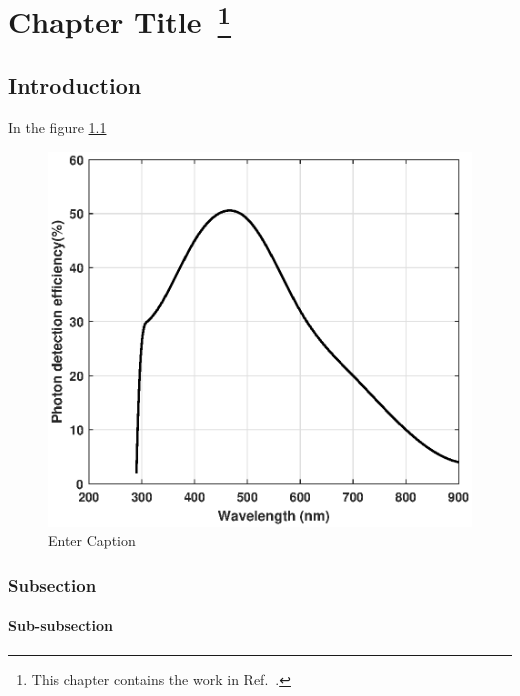 \chapter[Chapter Title]
{Chapter Title~\footnote{This chapter contains the work in Ref.~\cite{abc1}.}}
\label{chap:3}

\section{Introduction}
 In the figure \ref{fig:enter-label}  ~\cite{abc1} \lipsum[2-4]
\begin{figure}
    \centering
    \includegraphics[width=0.5\linewidth]{figures/pdeS13360.eps}
    \caption{Enter Caption}
    \label{fig:enter-label}
\end{figure}
\subsection{Subsection}
\lipsum[2-4]
\subsubsection{Sub-subsection}
\lipsum[2-4]
